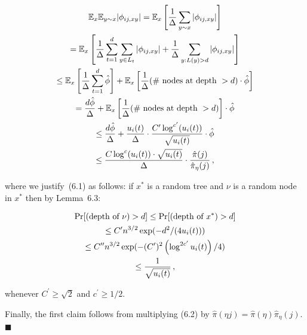 \documentclass[10pt,a4paper]{article}
\begin{document}
\[\begin{gathered}
\displaystyle\mathbb{E}_{x}\mathbb{E}_{y\sim x}|\phi_{ij,xy}| \displaystyle=\mathbb{E}_{x}\left[\frac{1}{\Delta}\sum_{y\sim x}|\phi_{ij,xy}|\right] \\
\displaystyle=\mathbb{E}_{x}\left[\frac{1}{\Delta}\sum_{t=1}^{d}\sum_{y\in L_{t}}|\phi_{ij,xy}|+\frac{1}{\Delta}\sum_{y:L(y)>d}|\phi_{ij,xy}|\right] \\
\displaystyle\leq\mathbb{E}_{x}\left[\frac{1}{\Delta}\sum_{t=1}^{d}\hat{\phi}\right]+\mathbb{E}_{x}\left[\frac{1}{\Delta}(\textnormal{\# nodes at depth }>d)\cdot\hat{\phi}\right] \\
\displaystyle=\frac{d\hat{\phi}}{\Delta}+\mathbb{E}_{x}\left[\frac{1}{\Delta}(\textnormal{\# nodes at depth }>d)\right]\cdot\hat{\phi} \\
\displaystyle\leq\frac{d\hat{\phi}}{\Delta}+\frac{u_{i}(t)}{\Delta}\cdot\frac{C^{\prime}\log^{c^{\prime}}(u_{i}(t))}{\sqrt{u_{i}(t)}}\cdot\hat{\phi} \\
\displaystyle\leq\frac{C\log^{c}(u_{i}(t))\cdot\sqrt{u_{i}(t)}}{\Delta}\cdot\frac{\hat{\pi}(j)}{\hat{\pi}_{\eta}(j)}\,,
\end{gathered}\]




where we justify (6.1) as follows: if $x^{*}$ is a random tree and $\nu$ is a random node in $x^{*}$ then by Lemma 6.3:\par


\[\begin{gathered}
\displaystyle\Pr[(\textnormal{depth of }\nu)>d] \displaystyle\leq\Pr[(\textnormal{depth of }x^{*})>d] \\
\displaystyle\leq C^{\prime}n^{3/2}\exp(-d^{2}/(4u_{i}(t))) \\
\displaystyle\leq C^{\prime\prime}n^{3/2}\exp(-(C^{\prime})^{2}\left(\log^{2c^{\prime}}u_{i}(t)\right)/4) \\
\displaystyle\leq\frac{1}{\sqrt{u_{i}(t)}}\,,
\end{gathered}\]


whenever $C^{\prime}\geq\sqrt{2}$ and $c^{\prime}\geq 1/2$.\par




Finally, the first claim follows from multiplying (6.2) by $\hat{\pi}(\eta j)=\hat{\pi}(\eta)\hat{\pi}_{\eta}(j)$.
\ensuremath{\blacksquare}\par




\end{document}
